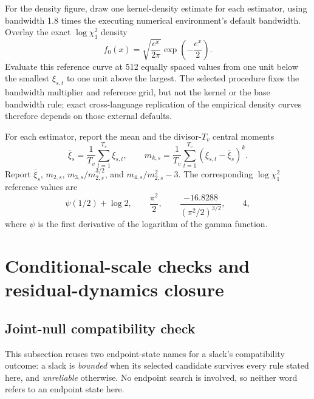 \documentclass[11pt]{article}
\begin{document}
For the density figure, draw one kernel-density estimate for each estimator,
using bandwidth 1.8 times the executing numerical environment's default
bandwidth. Overlay the exact \(\log\chi_1^2\) density
\begin{equation*}
 f_0(x)=\sqrt{\frac{e^x}{2\pi}}\exp\!\left(-\frac{e^x}{2}\right).
\end{equation*}
Evaluate this reference curve at 512 equally spaced values from one unit below
the smallest \(\xi_{s,t}\) to one unit above the largest. The selected procedure
fixes the bandwidth multiplier and reference grid, but not the kernel or the
base bandwidth rule; exact cross-language replication of the empirical density
curves therefore depends on those external defaults.

For each estimator, report the mean and the divisor-\(T_v\) central moments
\begin{equation*}
 \overline\xi_s=\frac1{T_v}\sum_{t=1}^{T_v}\xi_{s,t},\qquad
 m_{k,s}=\frac1{T_v}\sum_{t=1}^{T_v}(\xi_{s,t}-\overline\xi_s)^k.
\end{equation*}
Report \(\overline\xi_s\), \(m_{2,s}\), \(m_{3,s}/m_{2,s}^{3/2}\), and
\(m_{4,s}/m_{2,s}^2-3\). The corresponding \(\log\chi_1^2\) reference values
are
\begin{equation*}
 \psi(1/2)+\log2,\qquad
 \frac{\pi^2}{2},\qquad
 \frac{-16.8288}{(\pi^2/2)^{3/2}},\qquad
 4,
\end{equation*}
where \(\psi\) is the first derivative of the logarithm of the gamma function.

\section{Conditional-scale checks and residual-dynamics closure}

\subsection{Joint-null compatibility check}

This subsection reuses two endpoint-state names for a slack's compatibility outcome: a slack is
\emph{bounded} when its selected candidate survives every rule stated here, and \emph{unreliable}
otherwise. No endpoint search is involved, so neither word refers to an endpoint state here.
\end{document}
